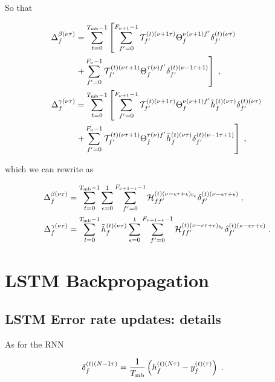 \begin{subappendices}
So that

\begin{align}
\Delta^{\beta(\nu \tau)}_{f}&=\sum_{t=0}^{T_{{\rm mb}}-1}\left[\sum_{f'=0}^{F_{\nu+1}-1}
%
\mathcal{T}^{(t)(\nu+1\tau)}_{f'}\Theta^{\nu(\nu+1)f'}_{f}\delta^{(t)(\nu\tau)}_{f'}\right.\notag\\
%
&\left.+\sum_{f'=0}^{F_{\nu}-1}
%
\mathcal{T}^{(t)(\nu\tau+1)}_{f'}\Theta^{\tau(\nu)f'}_{f}\delta^{(t)(\nu-1\tau+1)}_{f'}\right]\;,\\
%
\Delta^{\gamma(\nu \tau)}_{f}&=\sum_{t=0}^{T_{{\rm mb}}-1}\left[\sum_{f'=0}^{F_{\nu+1}-1}
%
\mathcal{T}^{(t)(\nu+1\tau)}_{f'}\Theta^{\nu(\nu+1)f'}_{f}
%
\tilde{h}^{(t)(\nu\tau)}_{f}\delta^{(t)(\nu\tau)}_{f'}\right.\notag\\
%
&\left.+\sum_{f'=0}^{F_{\nu}-1}\mathcal{T}^{(t)(\nu\tau+1)}_{f'}
%
\Theta^{\tau(\nu)f'}_{f}\tilde{h}^{(t)(\nu\tau)}_{f}\delta^{(t)(\nu-1\tau+1)}_{f'}\right]\;,
\end{align}

which we can rewrite as

\begin{align}
\Delta^{\beta(\nu \tau)}_{f}&=\sum_{t=0}^{T_{{\rm mb}}-1}\sum_{\epsilon=0}^{1}\sum_{f'=0}^{F_{\nu+1-\epsilon}-1}
%
\mathcal{H}^{(t)(\nu-\epsilon\tau+\epsilon)_{b_\epsilon}}_{ff'}\delta^{(t)(\nu-\epsilon\tau+\epsilon)}_{f'}\;,\\
%
\Delta^{\gamma(\nu \tau)}_{f}&=\sum_{t=0}^{T_{{\rm mb}}-1}\tilde{h}^{(t)(\nu\tau)}_{f}\sum_{\epsilon=0}^{1}\sum_{f'=0}^{F_{\nu+1-\epsilon}-1}
%
\mathcal{H}^{(t)(\nu-\epsilon\tau+\epsilon)_{b_\epsilon}}_{ff'}\delta^{(t)(\nu-\epsilon\tau+\epsilon)}_{f'}\;.
\end{align}

\section{LSTM Backpropagation}




\subsection{LSTM Error rate updates: details} \label{sec:ARNNLSTMerror_rates}

As for the RNN

\begin{align}
\delta^{(t)(N-1\tau)}_{f}&
%
=\frac{1}{T_{{\rm mb}}}\left(h^{(t)(N\tau)}_{f}-y^{(t)(\tau)}_{f}\right)\;.
\end{align}


\end{subappendices}
